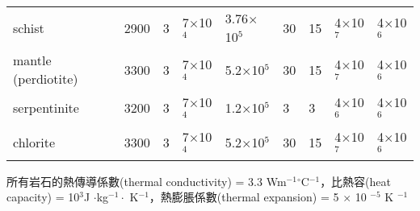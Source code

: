 \begin{landscape}
\begin{table}[htp]
\begin{tabular}{m{5.5cm}m{2cm}m{2cm}m{2.4cm}m{2.3cm}m{1cm}m{1cm}m{1.7cm}m{1.7cm}}
        schist                                                                                      & 2900                                                            & 3    & 7$\times$10$^4$                                                              & 3.76$\times$10$^5$                                                                         & 30                                                              & 15                                                              & 4$\times$10$^7$                                                & 4$\times$10$^6$                                                 \\
        mantle (perdiotite)                                                                         & 3300                                                            & 3    & 7$\times$10$^4$                                                              & 5.2$\times$10$^5$                                                                          & 30                                                              & 15                                                              & 4$\times$10$^7$                                                & 4$\times$10$^6$                                                 \\
        serpentinite                                                                                & 3200                                                            & 3    & 7$\times$10$^4$                                                              & 1.2$\times$10$^5$                                                                          & 3                                                               & 3                                                               & 4$\times$10$^6$                                                & 4$\times$10$^6$                                                 \\
        chlorite                                                                                    & 3300                                                            & 3    & 7$\times$10$^4$                                                              & 5.2$\times$10$^5$                                                                          & 30                                                              & 15                                                              & 4$\times$10$^7$                                                & 4$\times$10$^6$                                                 \\ \hline
    \end{tabular}
\label{table::phase_table}
\footnotesize 所有岩石的熱傳導係數(thermal conductivity) = 3.3 Wm$^{-1}$$^{\circ}$C$^{-1}$，比熱容(heat capacity) = 10$^3$J $\cdot$kg$^{-1} \cdot$ K$^{-1}$，熱膨脹係數(thermal expansion) = 5 $\times$ 10 $^{-5}$ K $^{-1}$
\end{table}
\end{landscape}